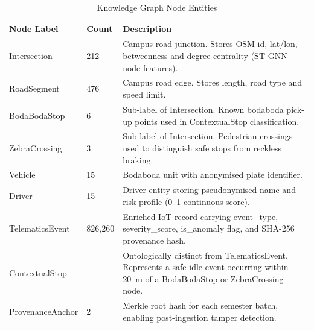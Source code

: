 \documentclass{ieeeaccess}
\begin{document}
\begin{table}[!t]
\caption{Knowledge Graph Node Entities}
\label{tab:kg_entities}
\centering
\begin{tabular}{|p{2.2cm}|p{1.3cm}|p{4.3cm}|}
\hline
\textbf{Node Label} & \textbf{Count} & \textbf{Description} \\
\hline
Intersection & 212 &
  Campus road junction. Stores OSM id, lat/lon, betweenness and
  degree centrality (ST-GNN node features). \\
\hline
RoadSegment & 476 &
  Campus road edge. Stores length, road type and speed limit. \\
\hline
BodaBodaStop & 6 &
  Sub-label of Intersection. Known bodaboda pick-up points used
  in ContextualStop classification. \\
\hline
ZebraCrossing & 3 &
  Sub-label of Intersection. Pedestrian crossings used to
  distinguish safe stops from reckless braking. \\
\hline
Vehicle & 15 &
  Bodaboda unit with anonymised plate identifier. \\
\hline
Driver & 15 &
  Driver entity storing pseudonymised name and risk profile
  (0--1 continuous score). \\
\hline
TelematicsEvent & 826,260 &
  Enriched IoT record carrying event\_type, severity\_score,
  is\_anomaly flag, and SHA-256 provenance hash. \\
\hline
ContextualStop & -- &
  Ontologically distinct from TelematicsEvent. Represents a safe
  idle event occurring within 20~m of a BodaBodaStop or
  ZebraCrossing node. \\
\hline
ProvenanceAnchor & 2 &
  Merkle root hash for each semester batch, enabling post-ingestion
  tamper detection. \\
\hline
\end{tabular}
\end{table}
\end{document}
